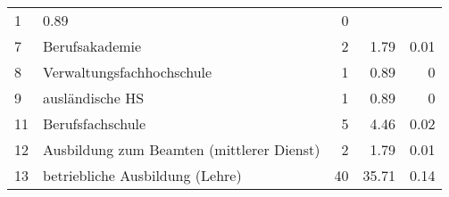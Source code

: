 \begin{longtable}{lXrrr}
       \num{1} &
       \num[round-mode=places,round-precision=2]{0.89} &
         \num[round-mode=places,round-precision=2]{0} \\

     7 &
     \multicolumn{1}{X}{ Berufsakademie   } &


       \num{2} &
       \num[round-mode=places,round-precision=2]{1.79} &
         \num[round-mode=places,round-precision=2]{0.01} \\

     8 &
     \multicolumn{1}{X}{ Verwaltungsfachhochschule   } &


       \num{1} &
       \num[round-mode=places,round-precision=2]{0.89} &
         \num[round-mode=places,round-precision=2]{0} \\

     9 &
     \multicolumn{1}{X}{ ausländische HS   } &


       \num{1} &
       \num[round-mode=places,round-precision=2]{0.89} &
         \num[round-mode=places,round-precision=2]{0} \\

     11 &
     \multicolumn{1}{X}{ Berufsfachschule   } &


       \num{5} &
       \num[round-mode=places,round-precision=2]{4.46} &
         \num[round-mode=places,round-precision=2]{0.02} \\

     12 &
     \multicolumn{1}{X}{ Ausbildung zum Beamten (mittlerer Dienst)   } &


       \num{2} &
       \num[round-mode=places,round-precision=2]{1.79} &
         \num[round-mode=places,round-precision=2]{0.01} \\

     13 &
     \multicolumn{1}{X}{ betriebliche Ausbildung (Lehre)   } &


       \num{40} &
       \num[round-mode=places,round-precision=2]{35.71} &
         \num[round-mode=places,round-precision=2]{0.14} \\


\end{longtable}
